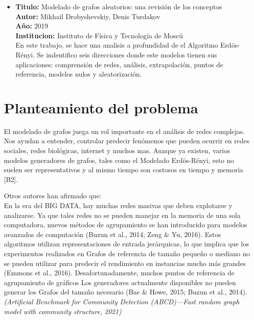 \documentclass[11pt]{extarticle}
\begin{document}
\begin{itemize}
  \item \textbf{Titulo:} Modelado de grafos aleatorios: una revisión de los conceptos\\
  \textbf{Autor:} Mikhail Drobyshevskiy, Denis Turdakov\\
  \textbf{A\~no:} 2019\\
  \textbf{Institucion:} Instituto de Física y Tecnología de Moscú\\
  En este trabajo, se hace una analisis a profundidad de el Algoritmo Erdös-Rényi.
  Se indentifico seis direcciones donde este modelos tienen sus aplicaciones: comprensión de redes, análisis, extrapolación, puntos de referencia, modelos nulos y aleatorización. 

\end{itemize}



\section{Planteamiento del problema}
  El modelado de grafos juega un rol importante en el an\'alisis de redes complejas. 
  Nos ayudan a entender, controlar predecir fen\'omenos que pueden ocurrir en redes sociales, 
  redes biol\'ogicas, internet y muchos mas. Aunque ya existen, varios modelos generadores de grafos, tales como el Modelado  Erdös-Rényi, esto no suelen ser representativos
  y al mismo tiempo son costosos en tiempo y memoria [B2].\hfill\break

  Otros autores han afirmado que:\\

  \footnotesize{
    En la era del BIG DATA, hay muchas redes masivas que deben explotarse y analizarse. Ya que
    tales redes no se pueden manejar en la memoria de una sola computadora, nuevos métodos de agrupamiento
    se han introducido para modelos avanzados de computación (Buzun et al., 2014; Zeng & Yu, 2016).
    Estos algoritmos utilizan representaciones de entrada jerárquicas, lo que implica que los experimentos realizados en Grafos de referencia de tamaño pequeño o mediano no se pueden utilizar para predecir el rendimiento en instancias mucho más grandes (Emmons et al., 2016). Desafortunadamente, muchos puntos de referencia de agrupamiento de gráficos
    Los generadores actualmente disponibles no pueden generar los Grafos del tamaño necesario (Bae & Howe,
    2015; Buzun et al., 2014).
  \textit{ (Artificial Benchmark for Community Detection (ABCD)—Fast random graph model with community structure, 2021)}
  }
\end{document}
